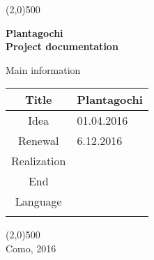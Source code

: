\documentclass[a4paper,12pt]{article} %
\begin{document}
\begin{titlepage}

\line(2,0){500}

\vspace{30pt}

\begin{center}
{\Huge \textbf{Plantagochi}}\\
\vspace{40pt}
{\huge \textbf{Project documentation}}\\
\end{center}

\vspace{70pt}

\begin{center}
{\large Main information}\\
\end{center}

\begin{tabularx}{\textwidth}{|c|X|}
\hline
Title & Plantagochi\\
\hline
Idea & 01.04.2016\\
\hline
Renewal & 6.12.2016\\
\hline
Realization & \\
\hline
End & \\
\hline
Language & \\
\hline
 & \\
\hline
\end{tabularx}

\vspace{\fill}
\begin{center}
\line(2,0){500}\\
Como, 2016
\end{center}

\end{titlepage}
\end{document}
